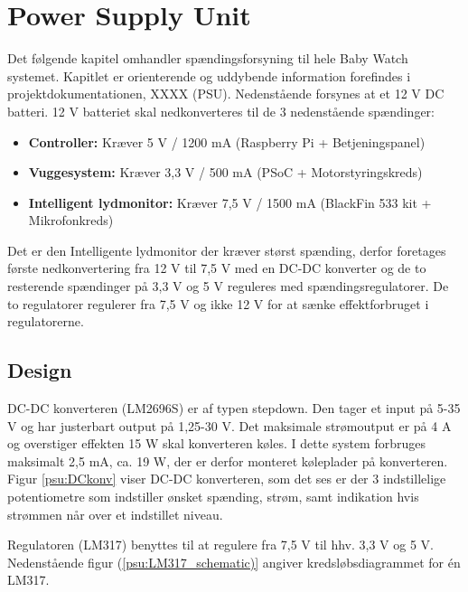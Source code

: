 \chapter{Power Supply Unit}

Det følgende kapitel omhandler spændingsforsyning til hele Baby Watch systemet. Kapitlet er orienterende og uddybende information forefindes i projektdokumentationen, XXXX (PSU). Nedenstående forsynes at et 12 V DC batteri. 12 V batteriet skal nedkonverteres til de 3 nedenstående spændinger: 
\begin{itemize}
\item \textbf{Controller:} Kræver 5 V / 1200 mA (Raspberry Pi + Betjeningspanel)

\item \textbf{Vuggesystem:} Kræver 3,3 V / 500 mA (PSoC + Motorstyringskreds)

\item \textbf{Intelligent lydmonitor:} Kræver 7,5 V / 1500 mA (BlackFin 533 kit + Mikrofonkreds)
\end{itemize}

Det er den Intelligente lydmonitor der kræver størst spænding, derfor foretages første nedkonvertering fra 12 V til 7,5 V med en DC-DC konverter og de to resterende spændinger på 3,3 V og 5 V reguleres med spændingsregulatorer. De to regulatorer regulerer fra 7,5 V og ikke 12 V for at sænke effektforbruget i regulatorerne. 

\section{Design}

DC-DC konverteren (LM2696S) er af typen stepdown. Den tager et input på 5-35 V og har justerbart output på 1,25-30 V. Det maksimale strømoutput er på 4 A og overstiger effekten 15 W skal konverteren køles. I dette system forbruges maksimalt 2,5 mA, ca. 19 W, der er derfor monteret køleplader på konverteren. Figur \ref{psu:DCkonv} viser DC-DC konverteren, som det ses er der 3 indstillelige potentiometre som indstiller ønsket spænding, strøm, samt indikation hvis strømmen når over et indstillet niveau.  


\newpage

Regulatoren (LM317) benyttes til at regulere fra 7,5 V til hhv. 3,3 V og 5 V. Nedenstående figur (\ref{psu:LM317_schematic)} angiver kredsløbsdiagrammet for én LM317.

